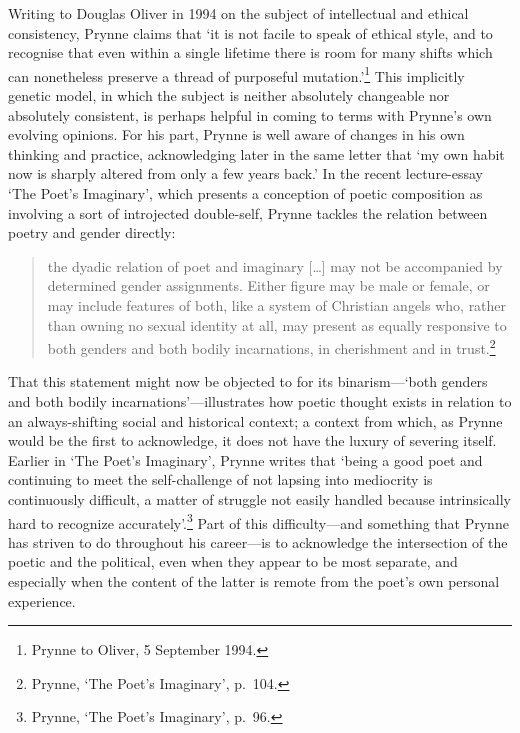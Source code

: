 \documentclass[]{article}
\begin{document}
Writing to Douglas Oliver in 1994 on the subject of intellectual and
ethical consistency, Prynne claims that `it is not facile to speak of
ethical style, and to recognise that even within a single lifetime there
is room for many shifts which can nonetheless preserve a thread of
purposeful mutation.'\footnote{Prynne to Oliver, 5 September 1994.} This
implicitly genetic model, in which the subject is neither absolutely
changeable nor absolutely consistent, is perhaps helpful in coming to
terms with Prynne's own evolving opinions. For his part, Prynne is well
aware of changes in his own thinking and practice, acknowledging later
in the same letter that `my own habit now is sharply altered from only a
few years back.' In the recent lecture-essay `The Poet's Imaginary',
which presents a conception of poetic composition as involving a sort of
introjected double-self, Prynne tackles the relation between poetry and
gender directly:

\begin{quote}
the dyadic relation of poet and imaginary {[}\ldots{}{]} may not be
accompanied by determined gender assignments. Either figure may be male
or female, or may include features of both, like a system of Christian
angels who, rather than owning no sexual identity at all, may present as
equally responsive to both genders and both bodily incarnations, in
cherishment and in trust.\footnote{Prynne, `The Poet's Imaginary',
  p.~104.}
\end{quote}

\noindent That this statement might now be objected to for its
binarism---`both genders and both bodily incarnations'---illustrates how
poetic thought exists in relation to an always-shifting social and
historical context; a context from which, as Prynne would be the first
to acknowledge, it does not have the luxury of severing itself. Earlier
in `The Poet's Imaginary', Prynne writes that `being a good poet and
continuing to meet the self-challenge of not lapsing into mediocrity is
continuously difficult, a matter of struggle not easily handled because
intrinsically hard to recognize accurately'.\footnote{Prynne, `The
  Poet's Imaginary', p.~96.} Part of this difficulty---and something
that Prynne has striven to do throughout his career---is to acknowledge
the intersection of the poetic and the political, even when they appear
to be most separate, and especially when the content of the latter is
remote from the poet's own personal experience.
\end{document}
